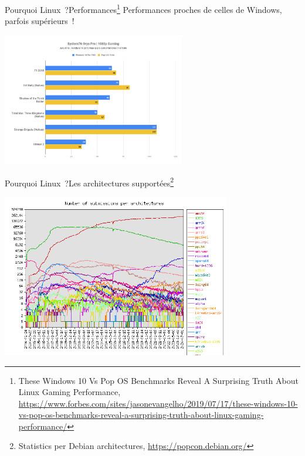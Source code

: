 \documentclass{beamer}
\begin{document}
    \begin{frame}{Pourquoi Linux~?}{Performances\footnote{These Windows 10 Vs Pop OS Benchmarks Reveal A Surprising Truth About Linux Gaming Performance, \url{https://www.forbes.com/sites/jasonevangelho/2019/07/17/these-windows-10-vs-pop-os-benchmarks-reveal-a-surprising-truth-about-linux-gaming-performance/}}}
        Performances proches de celles de Windows, parfois supérieurs~!
        \begin{center}
            \includegraphics[width=8cm]{image/linux-vs-windows}
        \end{center}
    \end{frame}

    \begin{frame}{Pourquoi Linux~?}{Les architectures supportées\footnote{Statistics per Debian architectures, \url{https://popcon.debian.org/}}}
        \begin{center}
            \includegraphics[width=10cm]{image/submission-by-architecture}
        \end{center}
    \end{frame}
\end{document}
